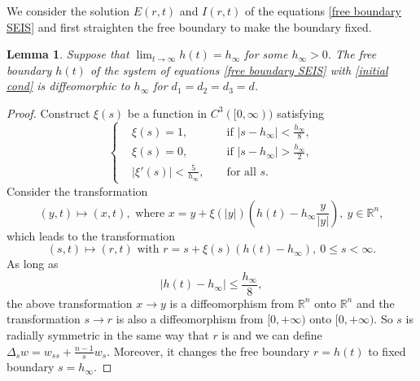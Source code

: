 \documentclass[11pt]{amsart}
\numberwithin{equation}{section}
\theoremstyle{plain}
\newtheorem{lemma}[theorem]{Lemma}
\theoremstyle{definition}
\begin{document}
We consider the solution $E(r,t)$ and $I(r,t)$  of the equations \cref{free boundary SEIS} and 
first straighten the free boundary to make the boundary fixed. 

\begin{lemma} \label{straightening lem2}
	Suppose that $\displaystyle \lim _{t \to \infty}h(t)=h_\infty$ for some $h_\infty >0$. The free boundary $h(t)$ of the system of equations \cref{free boundary SEIS} with \cref{initial cond} is diffeomorphic to $h_\infty$ for $d_1=d_2=d_3=d$.
\end{lemma}

\begin{proof}
	Construct $\xi(s)$ be a function in $C^3([0, \infty))$ satisfying
		\begin{equation*}
		\left \{ \begin{aligned}
			&\xi(s)=1, &&\text{\ if \ }\lvert s-h_\infty \rvert < \frac{h_\infty}{8},
			\\
			&\xi(s)=0, &&\text{\ if \ }\lvert s-h_\infty \rvert > \frac{h_\infty}{2},
			\\
			&\lvert \xi '(s) \rvert < \frac{5}{h_\infty}, &&\text{\ for all\ } s.
		\end{aligned} \right.
		\end{equation*}
		Consider the transformation
		\begin{equation*}
			(y,t) \mapsto (x,t), \text{ where } x=y+\xi(\lvert y \rvert )\left(h(t)-h_\infty \frac{y}{\lvert y \rvert}\right), \ y \in \mathbb{R}^n,
		\end{equation*}
		which leads to the transformation
		\begin{equation*}
			(s,t) \mapsto (r,t)\text{ with } r=s+\xi(s)(h(t)-h_\infty),\ 0 \leq s < \infty.
		\end{equation*}
		As long as
		\begin{equation*}
			\lvert h(t)-h_\infty \rvert \leq \frac{h_\infty}{8},
		\end{equation*}
		the above transformation $x \rightarrow y$ is a diffeomorphism from $\mathbb{R}^n$ onto $\mathbb{R}^n$ and the transformation $s \rightarrow r$ is also a diffeomorphism from $[0,+\infty)$ onto $[0,+\infty)$. So $s$ is radially symmetric in the same way that $r$ is and we can define $\Delta_s w = w_{ss}+ \frac{n-1}{s}w_s$. Moreover, it changes the free boundary $r=h(t)$ to fixed boundary $s=h_\infty$.
\end{proof}
\end{document}

